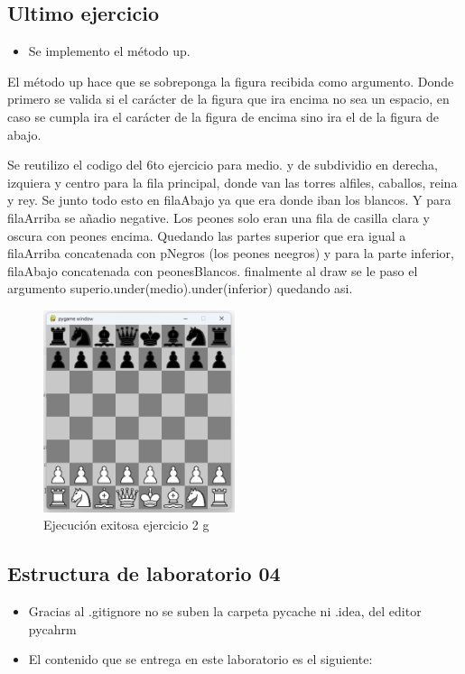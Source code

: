 \documentclass{article}
\begin{document}
	\subsection{Ultimo ejercicio}
	\begin{itemize}	
		\item Se implemento el método up.
	\end{itemize}
	
	El método up hace que se sobreponga la figura recibida como argumento. Donde primero se 
	valida si el carácter de la figura que ira encima no sea un espacio, en caso se cumpla
	ira el carácter de la figura de encima sino ira el de la figura de abajo.
	
	Se reutilizo el codigo del 6to ejercicio para medio. y de subdividio en derecha, izquiera y centro
	para la fila principal, donde van las torres alfiles, caballos, reina y rey. 
	Se junto todo esto en filaAbajo ya que era donde iban los blancos. Y para filaArriba
	se añadio negative. Los peones solo eran una fila de casilla clara y oscura con peones encima.
	Quedando las partes superior que era igual a filaArriba concatenada con pNegros
	(los peones neegros) y para la parte inferior, filaAbajo concatenada con peonesBlancos.
	finalmente al draw se le paso el argumento superio.under(medio).under(inferior) quedando asi.
	\begin{figure}[H]
		\centering
		\includegraphics[width=0.5\textwidth,keepaspectratio]{img/e2g.png}
		\caption{Ejecución exitosa ejercicio 2 g}
	\end{figure}
	\subsection{Estructura de laboratorio 04}
	\begin{itemize}	
		\item Gracias al .gitignore no se suben la carpeta pycache ni .idea, del editor pycahrm
		\item El contenido que se entrega en este laboratorio es el siguiente:
	\end{itemize}
	
\end{document}
